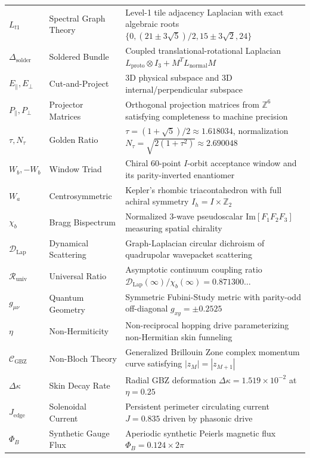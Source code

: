 \documentclass[11pt,a4paper]{article}
\theoremstyle{definition}
\newcommand{\Z}{\mathbb{Z}}
\begin{document}
\begin{longtable}{p{2.2cm}p{3.8cm}p{9.0cm}}
$L_{t1}$ & Spectral Graph Theory & Level-1 tile adjacency Laplacian with exact algebraic roots $\{0, (21\pm 3\sqrt{5})/2, 15\pm 3\sqrt{2}, 24\}$ \\
$\Delta_{\mathrm{solder}}$ & Soldered Bundle & Coupled translational-rotational Laplacian $L_{\mathrm{proto}} \otimes I_3 + M^T L_{\mathrm{normal}} M$ \\
$E_\parallel, E_\perp$ & Cut-and-Project & 3D physical subspace and 3D internal/perpendicular subspace \\
$P_\parallel, P_\perp$ & Projector Matrices & Orthogonal projection matrices from $\Z^6$ satisfying completeness to machine precision \\
$\tau, N_\tau$ & Golden Ratio & $\tau = (1+\sqrt{5})/2 \approx 1.618034$, normalization $N_\tau = \sqrt{2(1+\tau^2)} \approx 2.690048$ \\
$W_b, -W_b$ & Window Triad & Chiral 60-point $I$-orbit acceptance window and its parity-inverted enantiomer \\
$W_a$ & Centrosymmetric & Kepler's rhombic triacontahedron with full achiral symmetry $I_h = I \times \Z_2$ \\
$\chi_b$ & Bragg Bispectrum & Normalized 3-wave pseudoscalar $\mathrm{Im}[F_1 F_2 F_3]$ measuring spatial chirality \\
$\mathcal{D}_{\mathrm{Lap}}$ & Dynamical Scattering & Graph-Laplacian circular dichroism of quadrupolar wavepacket scattering \\
$\mathcal{R}_{\mathrm{univ}}$ & Universal Ratio & Asymptotic continuum coupling ratio $\mathcal{D}_{\mathrm{Lap}}(\infty)/\chi_b(\infty) = 0.871300\dots$ \\
$g_{\mu\nu}$ & Quantum Geometry & Symmetric Fubini-Study metric with parity-odd off-diagonal $g_{xy} = \pm 0.2525$ \\
$\eta$ & Non-Hermiticity & Non-reciprocal hopping drive parameterizing non-Hermitian skin funneling \\
$\mathcal{C}_{\mathrm{GBZ}}$ & Non-Bloch Theory & Generalized Brillouin Zone complex momentum curve satisfying $|z_M|=|z_{M+1}|$ \\
$\Delta\kappa$ & Skin Decay Rate & Radial GBZ deformation $\Delta\kappa = 1.519 \times 10^{-2}$ at $\eta = 0.25$ \\
$J_{\mathrm{edge}}$ & Solenoidal Current & Persistent perimeter circulating current $J = 0.835$ driven by phasonic drive \\
$\Phi_B$ & Synthetic Gauge Flux & Aperiodic synthetic Peierls magnetic flux $\Phi_B = 0.124 \times 2\pi$ \\

\end{longtable}
\end{document}
